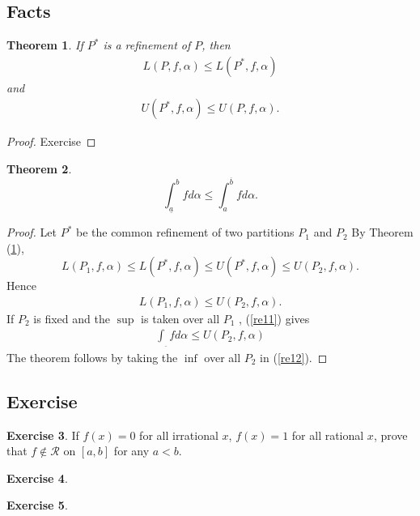\documentclass[	DIV=calc,paper=a4,fontsize=11pt]{scrartcl}	 	%
\newtheorem{thm}{Theorem}[section]
\theoremstyle{definition}
\newtheorem{exer}[thm]{Exercise}
\theoremstyle{plain}
\theoremstyle{remark}
\begin{document}
\subsection{Facts}

\begin{thm}\label{rt94}
If $P^*$ is a refinement of $P$, then
\begin{align}
L(P,f,\alpha)\leq L(P^*,f ,\alpha)
\end{align}
and
\begin{align}
U(P^*,f ,\alpha)\leq U(P ,f ,\alpha).
\end{align}
\end{thm}

\begin{proof}
Exercise
\end{proof}


\begin{thm}
\[\int_{\underline{a}}^b fd\alpha\leq \int_{a}^{\overline{b}}fd\alpha.\]
\end{thm}

\begin{proof}
Let $P^*$ be the common refinement of two partitions $P_1$ and $P_2$
By Theorem (\ref{rt94}),
\[L(P_1, f,\alpha)\leq L(P^*, f, \alpha)\leq U(P^*,f,\alpha)\leq U(P_2, f,\alpha).\]
Hence
\begin{align}\label{re11}
L(P_1 ,f, \alpha)\leq  U(P_2 ,f ,\alpha).
\end{align}
If $P_2$ is fixed and the $\sup$ is taken over all $P_1$ , (\ref{re11}) gives
\begin{align}\label{re12}
\int_{\underline{ \ }}fd\alpha\leq U(P_2,f,\alpha)
\end{align}
The theorem follows by taking the $\inf$ over all $P_2$ in (\ref{re12}).
\end{proof}

\newpage
\subsection{Exercise}
\begin{exer}\label{071}
If $f(x) = 0$ for all irrational $x$, $f(x) = 1$ for all rational $x$, prove that $f\notin \mathcal{R}$ on $[a, b]$
for any $a < b$.
\end{exer}

\begin{exer}\label{072}
\end{exer}

\begin{exer}\label{073}
\end{exer}
\end{document}
